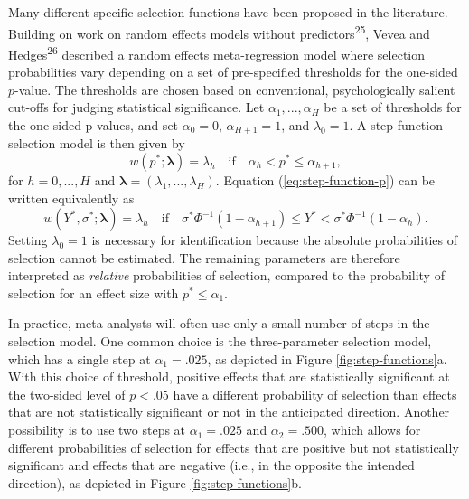 \documentclass[
  american,
  man, donotrepeattitle,floatsintext]{apa7}
\begin{document}
Many different specific selection functions have been proposed in the literature.
Building on work on random effects models without predictors\textsuperscript{25}, Vevea and Hedges\textsuperscript{26} described a random effects meta-regression model where selection probabilities vary depending on a set of pre-specified thresholds for the one-sided \(p\)-value.
The thresholds are chosen based on conventional, psychologically salient cut-offs for judging statistical significance.
Let \(\alpha_1,...,\alpha_H\) be a set of thresholds for the one-sided p-values, and set \(\alpha_0 = 0\), \(\alpha_{H+1} = 1\), and \(\lambda_0 = 1\).
A step function selection model is then given by
\begin{equation}
\label{eq:step-function-p}
w(p^*; \boldsymbol\lambda) =  \lambda_h \quad \text{if} \quad \alpha_{h} < p^* \leq \alpha_{h+1}, 
\end{equation}
for \(h = 0,...,H\) and \(\boldsymbol\lambda = \left(\lambda_1,...,\lambda_H\right)\).
Equation (\ref{eq:step-function-p}) can be written equivalently as
\begin{equation}
\label{eq:step-function-y}
w(Y^*, \sigma^*; \boldsymbol\lambda) =  \lambda_h \quad \text{if} \quad \sigma^* \Phi^{-1}\left(1 - \alpha_{h+1}\right) \leq Y^*  < \sigma^* \Phi^{-1}\left(1 - \alpha_h\right). 
\end{equation}
Setting \(\lambda_0 = 1\) is necessary for identification because the absolute probabilities of selection cannot be estimated.
The remaining parameters are therefore interpreted as \emph{relative} probabilities of selection, compared to the probability of selection for an effect size with \(p^* \leq \alpha_1\).

In practice, meta-analysts will often use only a small number of steps in the selection model.
One common choice is the three-parameter selection model, which has a single step at \(\alpha_1 = .025\), as depicted in Figure \ref{fig:step-functions}a.
With this choice of threshold, positive effects that are statistically significant at the two-sided level of \(p < .05\) have a different probability of selection than effects that are not statistically significant or not in the anticipated direction.
Another possibility is to use two steps at \(\alpha_1 = .025\) and \(\alpha_2 = .500\), which allows for different probabilities of selection for effects that are positive but not statistically significant and effects that are negative (i.e., in the opposite the intended direction), as depicted in Figure \ref{fig:step-functions}b.
\end{document}
